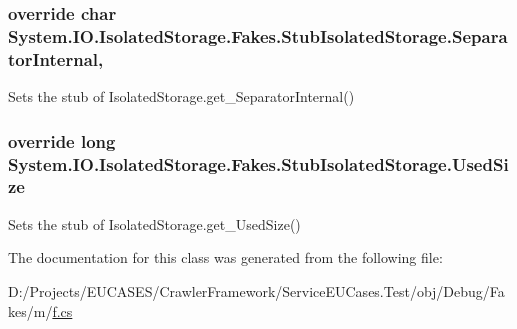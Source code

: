 \hypertarget{class_system_1_1_i_o_1_1_isolated_storage_1_1_fakes_1_1_stub_isolated_storage_a11ba62b04e42ce5dc4c8d6a775b0e273}{
\subsubsection[{Separator\-Internal}]{\setlength{\rightskip}{0pt plus 5cm}override char System.\-I\-O.\-Isolated\-Storage.\-Fakes.\-Stub\-Isolated\-Storage.\-Separator\-Internal\hspace{0.3cm}{\ttfamily [get]}, {\ttfamily [protected]}}}\label{class_system_1_1_i_o_1_1_isolated_storage_1_1_fakes_1_1_stub_isolated_storage_a11ba62b04e42ce5dc4c8d6a775b0e273}


Sets the stub of Isolated\-Storage.\-get\-\_\-\-Separator\-Internal()

\hypertarget{class_system_1_1_i_o_1_1_isolated_storage_1_1_fakes_1_1_stub_isolated_storage_a156998f712fd8f8f1b62c75319feab88}{
\subsubsection[{Used\-Size}]{\setlength{\rightskip}{0pt plus 5cm}override long System.\-I\-O.\-Isolated\-Storage.\-Fakes.\-Stub\-Isolated\-Storage.\-Used\-Size\hspace{0.3cm}{\ttfamily [get]}}}\label{class_system_1_1_i_o_1_1_isolated_storage_1_1_fakes_1_1_stub_isolated_storage_a156998f712fd8f8f1b62c75319feab88}


Sets the stub of Isolated\-Storage.\-get\-\_\-\-Used\-Size()



The documentation for this class was generated from the following file\-:\begin{DoxyCompactItemize}
\item 
D\-:/\-Projects/\-E\-U\-C\-A\-S\-E\-S/\-Crawler\-Framework/\-Service\-E\-U\-Cases.\-Test/obj/\-Debug/\-Fakes/m/\hyperlink{m_2f_8cs}{f.\-cs}\end{DoxyCompactItemize}

